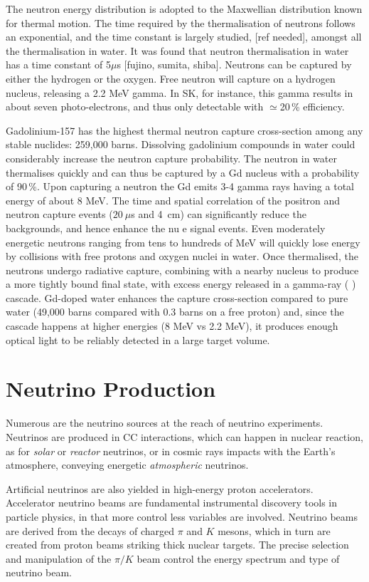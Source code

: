 The neutron energy distribution is adopted to the Maxwellian distribution known for thermal motion.
The time required by the thermalisation of neutrons follows an exponential, and the time constant is largely %
studied, [ref needed], amongst all the thermalisation in water.
It was found that neutron thermalisation in water has a time constant of 5$\mu$s [fujino, sumita, shiba].
Neutrons can be captured by either the hydrogen or the oxygen.
Free neutron will capture on a hydrogen nucleus, releasing a 2.2 MeV gamma.
In SK, for instance, this gamma results in about seven photo-electrons, and thus only detectable with $\simeq$20\,\% %
efficiency.

Gadolinium-157 has the highest thermal neutron capture cross-section among any stable %
nuclides: 259,000 barns.
Dissolving gadolinium compounds in water could considerably increase the neutron capture probability.
The neutron in water thermalises quickly and can thus be captured by a Gd nucleus with a probability of 90\,\%.
Upon capturing a neutron the Gd emits 3-4 gamma rays having a total energy of about 8 MeV.
The time and spatial correlation of the positron and neutron capture events ($20~\mu$s and 4~cm) %
can significantly reduce the backgrounds, and hence enhance the nu e signal events.
Even moderately energetic neutrons ranging from tens to hundreds of MeV will quickly lose energy %
by collisions with free protons and oxygen nuclei in water. 
Once thermalised, the neutrons undergo radiative capture, combining with a nearby nucleus to %
produce a more tightly bound final state, with excess energy released in a gamma-ray ( ) cascade. 
Gd-doped water enhances the capture cross-section compared to pure water %
(49,000 barns compared with 0.3 barns on a free proton) and, since the cascade happens %
at higher energies (8 MeV vs 2.2 MeV), it produces enough optical light to be reliably detected in %
a large target volume.


\section{Neutrino Production}
\label{sec:prod}

Numerous are the neutrino sources at the reach of neutrino experiments.
Neutrinos are produced in CC interactions, which can happen in nuclear reaction, as for \emph{solar} %
or \emph{reactor} neutrinos, or in cosmic rays impacts with the Earth's atmosphere, %
conveying energetic \emph{atmospheric} neutrinos.

Artificial neutrinos are also yielded in high-energy proton accelerators.
Accelerator neutrino beams are fundamental instrumental discovery tools in particle physics, in that more control %
less variables are involved.
Neutrino beams are derived from the decays of charged $\pi$ and $K$ mesons, which in turn are created from %
proton beams striking thick nuclear targets.
The precise selection and manipulation of the $\pi/K$ beam control the energy spectrum and type of neutrino beam.

